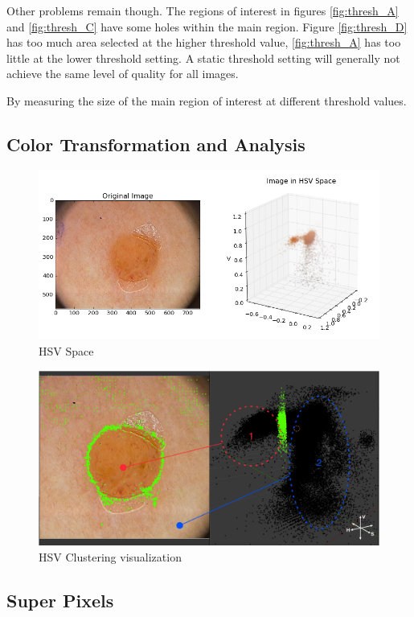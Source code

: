 Other problems remain though. The regions of interest in figures \ref{fig:thresh_A} and \ref{fig:thresh_C} have some holes within the main region. Figure \ref{fig:thresh_D} has too much area selected at the higher threshold value, \ref{fig:thresh_A} has too little at the lower threshold setting. A static threshold setting will generally not achieve the same level of quality for all images.

By measuring the size of the main region of interest at different threshold values.

\subsection{Color Transformation and Analysis}

\begin{figure}[H]
    \includegraphics[width=\textwidth,keepaspectratio]{assets/image_processing/hsv/hsv_3dplot.png}
    \caption{HSV Space}
    \label{fig:hsv_place}
\end{figure}

\begin{figure}[H]
    \includegraphics[width=\textwidth,keepaspectratio]{assets/image_processing/hsv/hsv_space.pdf}
    \caption{HSV Clustering visualization}
    \label{fig:hsv_3d}
\end{figure}



\subsection{Super Pixels}

